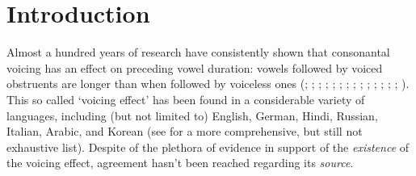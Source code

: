 \documentclass[preprint]{JASAnew}
\begin{document}

\maketitle




\section{Introduction}\label{introduction}

\label{s:intro}

Almost a hundred years of research have consistently shown that
consonantal voicing has an effect on preceding vowel duration: vowels
followed by voiced obstruents are longer than when followed by voiceless
ones (\citealt{meyer1904}; \citealt{heffner1937}; \citealt{house1953};
\citealt{belasco1953}; \citealt{peterson1960}; \citealt{halle1967};
\citealt{chen1970}; \citealt{klatt1973}; \citealt{lisker1974};
\citealt{laeufer1992}; \citealt{fowler1992}; \citealt{hussein1994};
\citealt{lampp2004}; \citealt{warren2005}; \citealt{durvasula2012}).
This so called `voicing effect' has been found in a considerable variety
of languages, including (but not limited to) English, German, Hindi,
Russian, Italian, Arabic, and Korean (see \citealt{maddieson1976} for a
more comprehensive, but still not exhaustive list). Despite of the
plethora of evidence in support of the \emph{existence} of the voicing
effect, agreement hasn't been reached regarding its \emph{source}.
\end{document}
